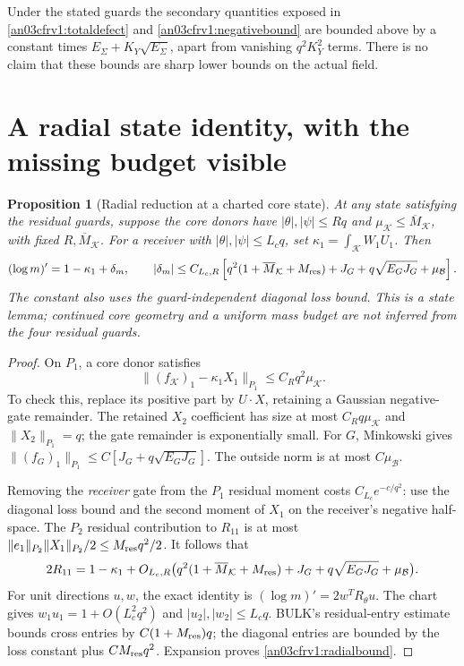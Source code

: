 \documentclass[11pt]{article}
\newtheorem{proposition}{Proposition}[section]
\theoremstyle{remark}\newtheorem{remark}[proposition]{Remark}
\newcommand{\KK}{\mathcal K}
\newcommand{\BB}{\mathcal B}
\begin{document}
Under the stated guards the secondary quantities exposed in
\eqref{an03cfrv1:totaldefect} and
\eqref{an03cfrv1:negativebound} are bounded above by a constant
times $E_\Sigma+K_Y\sqrt{E_\Sigma}$, apart from vanishing
$q^2K_Y^2$ terms. There is no claim that these bounds are
sharp lower bounds on the actual field.

\section{A radial state identity, with the missing budget visible}
\begin{proposition}[Radial reduction at a charted core state]
\label{an03cfrv1:radial}
At any state satisfying the residual guards, suppose the core
donors have $|\theta|,|\psi|\le Rq$ and
$\mu_{\KK}\le\overline M_{\KK}$, with fixed $R,\overline M_{\KK}$.
For a receiver with $|\theta|,|\psi|\le L_cq$, set
$\kappa_1=\int_{\KK}W_1U_1$.
Then
\begin{equation}
 (\log m)'=1-\kappa_1+\delta_m,\qquad
 |\delta_m|\le C_{L_c,R}\left[
 q^2(1+\overline M_{\KK}+M_{\rm res})
 +J_G+q\sqrt{E_GJ_G}+\mu_{\BB}\right].
 \label{an03cfrv1:radialbound}
\end{equation}
The constant also uses the guard-independent diagonal loss bound.
This is a state lemma; continued core geometry and a uniform
mass budget are not inferred from the four residual guards.
\end{proposition}
\begin{proof}
On $P_1$, a core donor satisfies
\[
 \|(f_{\KK})_1-\kappa_1X_1\|_{P_1}
 \le C_Rq^2\mu_{\KK}.
\]
To check this, replace its positive part by $U\cdot X$,
retaining a Gaussian negative-gate remainder. The retained
$X_2$ coefficient has size at most $C_Rq\mu_{\KK}$ and
$\|X_2\|_{P_1}=q$; the gate remainder is exponentially small.
For $G$, Minkowski gives
$\|(f_G)_1\|_{P_1}\le C[J_G+q\sqrt{E_GJ_G}]$.
The outside norm is at most $C\mu_{\BB}$.

Removing the \emph{receiver} gate from the $P_1$ residual
moment costs $C_{L_c}e^{-c/q^2}$: use the diagonal loss bound
and the second moment of $X_1$ on the receiver's negative
half-space. The $P_2$ residual contribution to $R_{11}$
is at most
$\|e_1\|_{P_2}\|X_1\|_{P_2}/2\le M_{\rm res}q^2/2$.
It follows that
\[
 2R_{11}=1-\kappa_1+
 O_{L_c,R}\big(q^2(1+\overline M_{\KK}+M_{\rm res})
       +J_G+q\sqrt{E_GJ_G}+\mu_{\BB}\big).
\]
For unit directions $u,w$, the exact identity is
$(\log m)'=2w^TR_\theta u$.
The chart gives $w_1u_1=1+O(L_c^2q^2)$ and
$|u_2|,|w_2|\le L_cq$.
BULK's residual-entry estimate bounds cross entries by
$C(1+M_{\rm res})q$; the diagonal entries are bounded by the
loss constant plus $CM_{\rm res}q^2$.
Expansion proves \eqref{an03cfrv1:radialbound}.
\end{proof}
\end{document}
